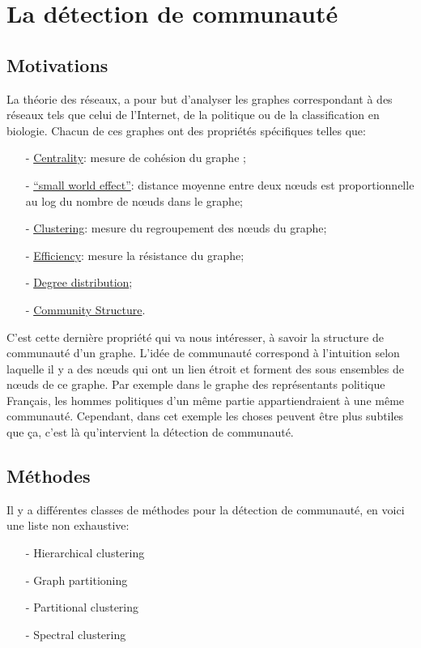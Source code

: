 \section{La détection de communauté}
\subsection{Motivations}
La théorie des réseaux, a pour but d'analyser les graphes correspondant à des réseaux tels que celui de l'Internet, de la politique ou de la classification en biologie.
Chacun de ces graphes ont des propriétés spécifiques telles que:
\begin{itemize}
 	\item[-] \underline{Centrality}: mesure de cohésion du graphe ;
 	\item[-] \underline{``small world effect''}:  distance moyenne entre deux nœuds est proportionnelle au log du nombre de nœuds dans le graphe;
 	\item[-] \underline{Clustering}: mesure du regroupement des nœuds du graphe;
 	\item[-] \underline{Efficiency}: mesure la résistance du graphe;
 	\item[-] \underline{Degree distribution}; 
 	\item[-] \underline{Community Structure}.\\
 \end{itemize}
C'est cette dernière propriété qui va nous intéresser, à savoir la structure de communauté d'un graphe.
L'idée de communauté correspond à l'intuition selon laquelle il y a des nœuds qui ont un lien étroit et forment des sous ensembles de nœuds de ce graphe.
Par exemple dans le graphe des représentants politique Français, les hommes politiques d'un même partie appartiendraient à une même communauté.
Cependant, dans cet exemple les choses peuvent être plus subtiles que ça, c'est là qu'intervient la détection de communauté.

\subsection{Méthodes}
Il y a différentes classes de méthodes pour la détection de communauté, en voici une liste non exhaustive:
\begin{itemize}
	\item[-] Hierarchical clustering
	\item[-] Graph partitioning
	\item[-] Partitional clustering
	\item[-] Spectral clustering \\
\end{itemize}

